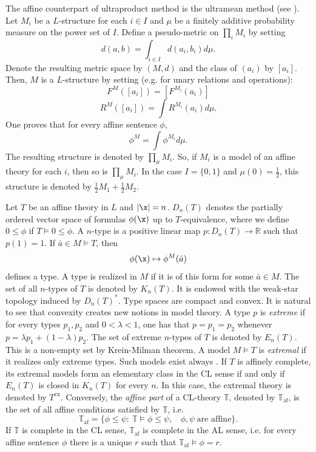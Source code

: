 \documentclass[12pt]{article}
\def\a{\bar{a}}\def\b{\bar{b}}\def\c{\bar{c}}
\def\Rn{\mathbb R}
\begin{document}
The affine counterpart of ultraproduct method is the ultramean method (see \cite{ACMT}).
Let $M_i$ be a $L$-structure for each $i\in I$ and $\mu$ be a finitely additive
probability measure on the power set of $I$.
Define a pseudo-metric on $\prod_{i}M_i$ by setting $$d(a,b)=\int_{i\in I} d(a_i,b_i)d\mu.$$
Denote the resulting metric space by $(M,d)$ and the class of $(a_i)$ by $[a_i]$.
Then, $M$ is a $L$-structure by setting (e.g. for unary relations and operations):
$$F^M([a_i])=[F^{M_i}(a_i)]$$$$R^M([a_i])=\int R^{M_i}(a_i)d\mu.$$
One proves that for every affine sentence $\phi$, $$\phi^M=\int\phi^{M_i}d\mu.$$
The resulting structure is denoted by $\prod_{\mu}M_i$.
So, if $M_i$ is a model of an affine theory for each $i$, then so is $\prod_{\mu}M_i$.
In the case $I=\{0,1\}$ and $\mu(0)=\frac{1}{2}$, this structure is denoted by $\frac{1}{2}M_1+\frac{1}{2}M_2$.

Let $T$ be an affine theory in $L$ and $|\x|=n$. $D_n(T)$ denotes the partially ordered vector space of formulas
$\phi(\x)$ up to $T$-equivalence, where we define $0\leqslant\phi$ if $T\vDash0\leqslant\phi$.
A $n$-type is a positive linear map $p:D_n(T)\rightarrow\Rn$ such that $p(1)=1$.
If $\a\in M\vDash T$, then $$\phi(\x)\mapsto\phi^M(\a)$$ defines a type.
A type is realized in $M$ if it is of this form for some $\a\in M$. The set of all $n$-types of $T$
is denoted by $K_n(T)$. It is endowed with the weak-star topology induced by $D_n(T)^*$.
Type spaces are compact and convex. It is natural to see that convexity creates
new notions in model theory.
A type $p$ is \emph{extreme} if for every types $p_1,p_2$ and $0<\lambda<1$,
one has that $p=p_1=p_2$ whenever $p=\lambda p_1+(1-\lambda)p_2$.
The set of extreme $n$-types of $T$ is denoted by $E_n(T)$.
This is a non-empty set by Krein-Milman theorem. A model $M\vDash T$ is \emph{extremal} if it realizes only
extreme types. Such models exist always \cite{Bagheri-Extreme}.
If $T$ is affinely complete, its extremal models form an elementary class in the
CL sense if and only if $E_n(T)$ is closed in $K_n(T)$
for every $n$. In this case, the extremal theory is denoted by $T^{\textrm{ex}}$.
Conversely, the \emph{affine part} of a CL-theory $\mathbb{T}$, denoted by $\mathbb{T}_{\textrm {af}}$,
is the set of all affine conditions satisfied by $\mathbb{T}$, i.e.
$$\mathbb{T}_{\textrm {af}}=\{\phi\leqslant\psi:\ \mathbb{T}\vDash\phi\leqslant\psi,\ \ \ \ \phi,\psi\ \textrm{are affine}\}.$$
If $\mathbb{T}$ is complete in the CL sense, $\mathbb{T}_{\textrm {af}}$
is complete in the AL sense, i.e. for every affine sentence $\phi$ there is a unique $r$
such that $\mathbb{T}_{\textrm {af}}\vDash\phi=r$.
\end{document}
